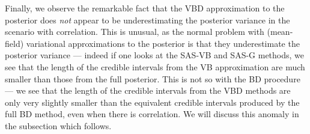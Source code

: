 \documentclass[11pt]{article}
\begin{document}
Finally, we observe the remarkable fact that the VBD approximation to the posterior does {\it not} appear to be underestimating the posterior variance in the scenario with correlation. This is unusual, as the normal problem with (mean-field) variational approximations to the posterior is that they underestimate the posterior variance --- indeed if one looks at the SAS-VB and SAS-G methods, we see that the length of the credible intervals from the VB approximation are much smaller than those from the full posterior. This is not so with the BD procedure --- we see that the length of the credible intervals from the VBD methods are only very slightly smaller than the equivalent credible intervals produced by the full BD method, even when there is correlation. We will discuss this anomaly in the subsection which follows.
\end{document}
